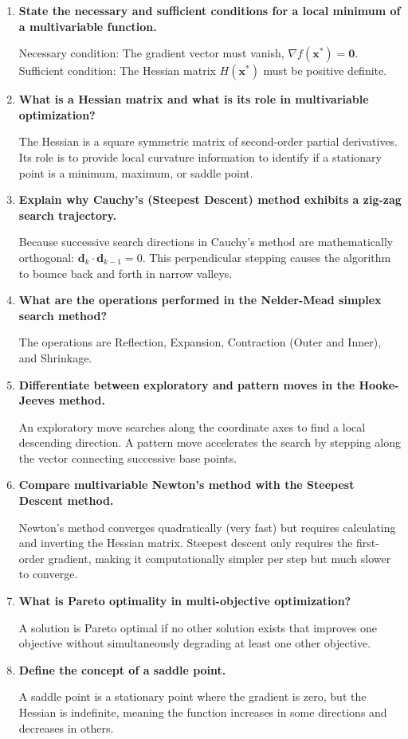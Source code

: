 \documentclass[12pt,a4paper]{article}
\newcommand{\Q}[1]{\textbf{#1}\par\noindent\ignorespaces}
\begin{document}
\begin{tcolorbox}[exambox, title={\textbf{Frequently Asked / Viva Questions}}]
\begin{enumerate}[topsep=0pt, label=\textbf{Q\arabic*.}, itemsep=5pt]
  \item \Q{State the necessary and sufficient conditions for a local minimum of a multivariable function.}
    Necessary condition: The gradient vector must vanish, $\nabla f(\mathbf{x}^*) = \mathbf{0}$. Sufficient condition: The Hessian matrix $H(\mathbf{x}^*)$ must be positive definite.
  \item \Q{What is a Hessian matrix and what is its role in multivariable optimization?}
    The Hessian is a square symmetric matrix of second-order partial derivatives. Its role is to provide local curvature information to identify if a stationary point is a minimum, maximum, or saddle point.
  \item \Q{Explain why Cauchy's (Steepest Descent) method exhibits a zig-zag search trajectory.}
    Because successive search directions in Cauchy's method are mathematically orthogonal: $\mathbf{d}_k \cdot \mathbf{d}_{k-1} = 0$. This perpendicular stepping causes the algorithm to bounce back and forth in narrow valleys.
  \item \Q{What are the operations performed in the Nelder-Mead simplex search method?}
    The operations are Reflection, Expansion, Contraction (Outer and Inner), and Shrinkage.
  \item \Q{Differentiate between exploratory and pattern moves in the Hooke-Jeeves method.}
    An exploratory move searches along the coordinate axes to find a local descending direction. A pattern move accelerates the search by stepping along the vector connecting successive base points.
  \item \Q{Compare multivariable Newton's method with the Steepest Descent method.}
    Newton's method converges quadratically (very fast) but requires calculating and inverting the Hessian matrix. Steepest descent only requires the first-order gradient, making it computationally simpler per step but much slower to converge.
  \item \Q{What is Pareto optimality in multi-objective optimization?}
    A solution is Pareto optimal if no other solution exists that improves one objective without simultaneously degrading at least one other objective.
  \item \Q{Define the concept of a saddle point.}
    A saddle point is a stationary point where the gradient is zero, but the Hessian is indefinite, meaning the function increases in some directions and decreases in others.

\end{enumerate}
\end{tcolorbox}
\end{document}
